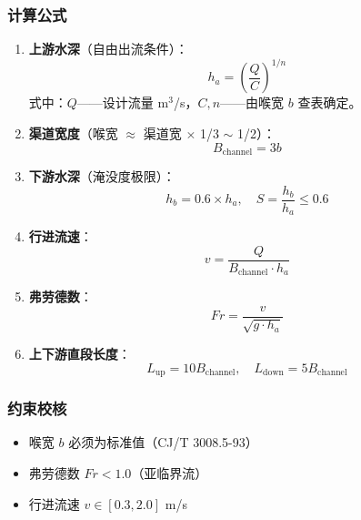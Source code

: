 \documentclass[12pt,a4paper]{ctexart}
\begin{document}
\subsubsection{计算公式}

\begin{enumerate}[label=(\arabic*), leftmargin=*]
    \item \textbf{上游水深}（自由出流条件）：
    \begin{equation}
        h_a = \left(\frac{Q}{C}\right)^{1/n}
    \end{equation}
    式中：$Q$——设计流量 m$^3$/s，$C, n$——由喉宽 $b$ 查表确定。

    \item \textbf{渠道宽度}（喉宽 $\approx$ 渠道宽 $\times$ 1/3 $\sim$ 1/2）：
    \begin{equation}
        B_{\text{channel}} = 3b
    \end{equation}

    \item \textbf{下游水深}（淹没度极限）：
    \begin{equation}
        h_b = 0.6 \times h_a, \quad S = \frac{h_b}{h_a} \leq 0.6
    \end{equation}

    \item \textbf{行进流速}：
    \begin{equation}
        v = \frac{Q}{B_{\text{channel}} \cdot h_a}
    \end{equation}

    \item \textbf{弗劳德数}：
    \begin{equation}
        Fr = \frac{v}{\sqrt{g \cdot h_a}}
    \end{equation}

    \item \textbf{上下游直段长度}：
    \begin{equation}
        L_{\text{up}} = 10 B_{\text{channel}}, \quad
        L_{\text{down}} = 5 B_{\text{channel}}
    \end{equation}
\end{enumerate}

\subsubsection{约束校核}
\begin{itemize}[itemsep=0pt]
    \item 喉宽 $b$ 必须为标准值（CJ/T 3008.5-93）
    \item 弗劳德数 $Fr < 1.0$（亚临界流）
    \item 行进流速 $v \in [0.3, 2.0]$ m/s
\end{itemize}
\end{document}
